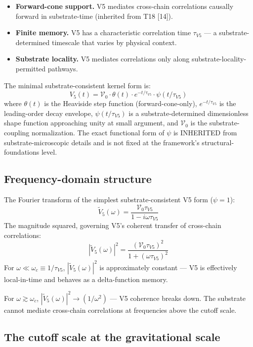 \documentclass[11pt,a4paper]{article}
\begin{document}
\begin{itemize}[noitemsep]
\item \textbf{Forward-cone support.} V5 mediates cross-chain correlations causally forward in substrate-time (inherited from T18 [14]).
\item \textbf{Finite memory.} V5 has a characteristic correlation time $\tau_{V5}$ --- a substrate-determined timescale that varies by physical context.
\item \textbf{Substrate locality.} V5 mediates correlations only along substrate-locality-permitted pathways.
\end{itemize}

The minimal substrate-consistent kernel form is:
\[
V_5(t) = \mathcal{V}_0 \cdot \theta(t) \cdot e^{-t/\tau_{V5}} \cdot \psi(t/\tau_{V5})
\]
where $\theta(t)$ is the Heaviside step function (forward-cone-only), $e^{-t/\tau_{V5}}$ is the leading-order decay envelope, $\psi(t/\tau_{V5})$ is a substrate-determined dimensionless shape function approaching unity at small argument, and $\mathcal{V}_0$ is the substrate-coupling normalization. The exact functional form of $\psi$ is INHERITED from substrate-microscopic details and is not fixed at the framework's structural-foundations level.

\subsection{Frequency-domain structure}

The Fourier transform of the simplest substrate-consistent V5 form ($\psi = 1$):
\[
\tilde V_5(\omega) = \frac{\mathcal{V}_0 \tau_{V5}}{1 - i\omega\tau_{V5}}
\]
The magnitude squared, governing V5's coherent transfer of cross-chain correlations:
\[
|\tilde V_5(\omega)|^{2} = \frac{(\mathcal{V}_0 \tau_{V5})^{2}}{1 + (\omega\tau_{V5})^{2}}
\]
For $\omega \ll \omega_c \equiv 1/\tau_{V5}$, $|\tilde V_5(\omega)|^{2}$ is approximately constant --- V5 is effectively local-in-time and behaves as a delta-function memory.

For $\omega \gtrsim \omega_c$, $|\tilde V_5(\omega)|^{2} \to (1/\omega^{2})$ --- V5 coherence breaks down. The substrate cannot mediate cross-chain correlations at frequencies above the cutoff scale.

\subsection{The cutoff scale at the gravitational scale}
\end{document}
